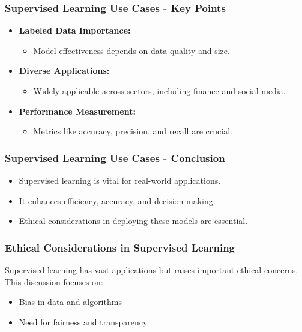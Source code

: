 \documentclass[aspectratio=169]{beamer}
\begin{document}
\begin{frame}[fragile]
    \frametitle{Supervised Learning Use Cases - Key Points}
    \begin{itemize}
        \item \textbf{Labeled Data Importance:} 
            \begin{itemize}
                \item Model effectiveness depends on data quality and size.
            \end{itemize}
        \item \textbf{Diverse Applications:}
            \begin{itemize}
                \item Widely applicable across sectors, including finance and social media.
            \end{itemize}
        \item \textbf{Performance Measurement:}
            \begin{itemize}
                \item Metrics like accuracy, precision, and recall are crucial.
            \end{itemize}
    \end{itemize}
\end{frame}

\begin{frame}[fragile]
    \frametitle{Supervised Learning Use Cases - Conclusion}
    \begin{itemize}
        \item Supervised learning is vital for real-world applications.
        \item It enhances efficiency, accuracy, and decision-making.
        \item Ethical considerations in deploying these models are essential.
    \end{itemize}
\end{frame}

\begin{frame}[fragile]
    \frametitle{Ethical Considerations in Supervised Learning}
    Supervised learning has vast applications but raises important ethical concerns. 
    This discussion focuses on:
    \begin{itemize}
        \item Bias in data and algorithms
        \item Need for fairness and transparency
    \end{itemize}
\end{frame}
\end{document}
